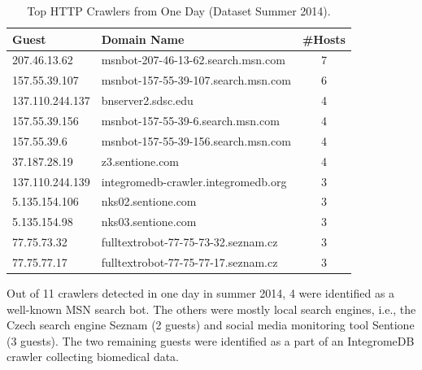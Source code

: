 \begin{table}[ht]
\centering
\begin{tabular}{| l | l | c |} \hline
Guest & Domain Name & \#Hosts \\ \hline
207.46.13.62    & msnbot-207-46-13-62.search.msn.com  & 7 \\ \hline
157.55.39.107   & msnbot-157-55-39-107.search.msn.com & 6 \\ \hline
137.110.244.137 & bnserver2.sdsc.edu                  & 4 \\ \hline
157.55.39.156   & msnbot-157-55-39-6.search.msn.com   & 4 \\ \hline
157.55.39.6 & msnbot-157-55-39-156.search.msn.com & 4 \\ \hline
37.187.28.19    & z3.sentione.com                     & 4 \\ \hline
137.110.244.139 & integromedb-crawler.integromedb.org & 3 \\ \hline
5.135.154.106   & nks02.sentione.com                  & 3 \\ \hline
5.135.154.98    & nks03.sentione.com                  & 3 \\ \hline
77.75.73.32 & fulltextrobot-77-75-73-32.seznam.cz & 3 \\ \hline
77.75.77.17 & fulltextrobot-77-75-77-17.seznam.cz & 3 \\ \hline
\end{tabular}
\caption{Top HTTP Crawlers from One Day (Dataset Summer 2014).}
\label{tab:httpsecurity-crawlers}
\end{table}

Out of 11 crawlers detected in one day in summer 2014, 4 were identified as a well-known MSN search bot. The others were mostly local search engines, i.e., the Czech search engine Seznam (2 guests) and social media monitoring tool Sentione (3 guests). The two remaining guests were identified as a part of an IntegromeDB crawler collecting biomedical data.

